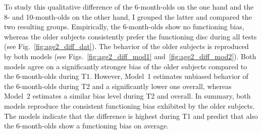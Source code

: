 \documentclass[a4paper]{scrreprt}
\begin{document}
To study this qualitative difference of the 6-month-olds on the one hand and the 8- and 10-month-olds on the other hand, I grouped the latter and compared the two resulting groups. Empirically, the 6-month-olds show no functioning bias, whereas the older subjects consistently prefer the functioning disc during all tests (see Fig.~\ref{fig:age2_diff_dat}). The behavior of the older subjects is reproduced by both models (see Figs.~\ref{fig:age2_diff_mod1} and~\ref{fig:age2_diff_mod2}). Both models agree on a significantly stronger bias of the older subjects compared to the 6-month-olds during T1. However, Model~1 estimates unbiased behavior of the 6-month-olds during T2 and a significantly lower one overall, whereas Model~2 estimates a similar bias level during T2 and overall. In summary, both models reproduce the consistent functioning bias exhibited by the older subjects. The models indicate that the difference is highest during T1 and predict that also the 6-month-olds show a functioning bias on average.
\end{document}
